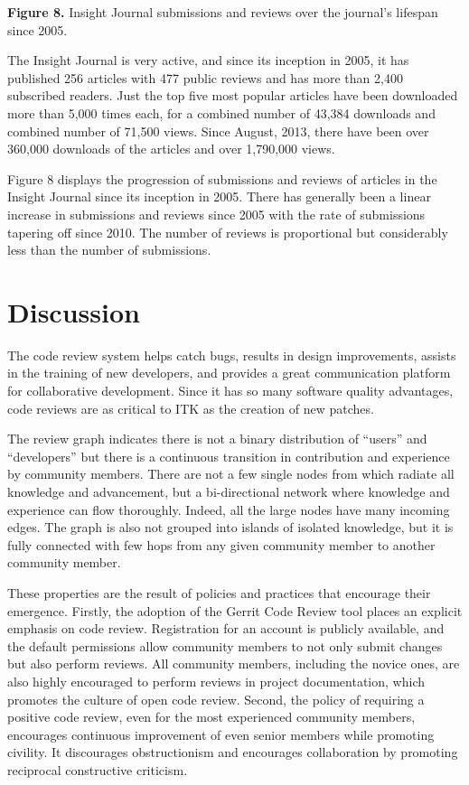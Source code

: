 \documentclass{frontiersENG} %
\begin{document}
\textbf{Figure 8. }{Insight Journal submissions and reviews over the journal's
lifespan since 2005.} \label{fig:08}

%
%
%
The Insight Journal is very active, and since its inception in 2005, it has published
256 articles with 477 public reviews and has more than 2,400 subscribed
readers. Just the top five most popular articles have been downloaded more than
5,000 times each, for a combined number of 43,384 downloads and combined number
of 71,500 views. Since August, 2013, there have been over 360,000 downloads of
the articles and over 1,790,000 views.

Figure 8 displays the progression of submissions and reviews of articles in the
Insight Journal since its inception in 2005.  There has generally been a linear
increase in submissions and reviews since 2005 with the rate of submissions
tapering off since 2010.  The number of reviews is proportional but
considerably less than the number of submissions.




\section{Discussion}

The code review system helps catch bugs, results in design improvements,
assists in the training of new developers, and provides a great communication
platform for collaborative development. Since it has so many software quality
advantages, code reviews are as critical to ITK as the creation of new patches.

The review graph indicates there is not a binary distribution of ``users'' and
``developers'' but there is a continuous transition in contribution and experience
by community members. There are not a few single nodes from which radiate all
knowledge and advancement, but a bi-directional network where knowledge and
experience can flow thoroughly.  Indeed, all the large nodes have many
incoming edges. The graph is also not grouped into islands of
isolated knowledge, but it is fully connected with few hops from any given
community member to another community member.

These properties are the result of policies and practices that encourage their
emergence. Firstly, the adoption of the Gerrit Code Review tool places an
explicit emphasis on code review.  Registration for an account is publicly
available, and the default permissions allow community
members to not only submit changes but also perform reviews. All community
members, including the novice ones, are also highly encouraged to perform
reviews in project documentation, which promotes the culture of open code
review. Second, the policy of requiring a positive code review, even for the
most experienced community members, encourages continuous improvement of even
senior members while promoting civility. It discourages obstructionism and
encourages collaboration by promoting reciprocal constructive criticism.
\end{document}
